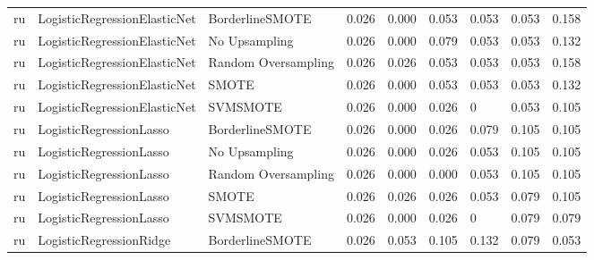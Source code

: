 \begin{tabular}{lllllllll}
      ru & LogisticRegressionElasticNet &     BorderlineSMOTE & 0.026 &                     0.000 &                 0.053 &                  0.053 &                                   0.053 &     0.158 \\
      ru & LogisticRegressionElasticNet &       No Upsampling & 0.026 &                     0.000 &                 0.079 &                  0.053 &                                   0.053 &     0.132 \\
      ru & LogisticRegressionElasticNet & Random Oversampling & 0.026 &                     0.026 &                 0.053 &                  0.053 &                                   0.053 &     0.158 \\
      ru & LogisticRegressionElasticNet &               SMOTE & 0.026 &                     0.000 &                 0.053 &                  0.053 &                                   0.053 &     0.132 \\
      ru & LogisticRegressionElasticNet &            SVMSMOTE & 0.026 &                     0.000 &                 0.026 &                      0 &                                   0.053 &     0.105 \\
      ru &      LogisticRegressionLasso &     BorderlineSMOTE & 0.026 &                     0.000 &                 0.026 &                  0.079 &                                   0.105 &     0.105 \\
      ru &      LogisticRegressionLasso &       No Upsampling & 0.026 &                     0.000 &                 0.026 &                  0.053 &                                   0.105 &     0.105 \\
      ru &      LogisticRegressionLasso & Random Oversampling & 0.026 &                     0.000 &                 0.000 &                  0.053 &                                   0.105 &     0.105 \\
      ru &      LogisticRegressionLasso &               SMOTE & 0.026 &                     0.026 &                 0.026 &                  0.053 &                                   0.079 &     0.105 \\
      ru &      LogisticRegressionLasso &            SVMSMOTE & 0.026 &                     0.000 &                 0.026 &                      0 &                                   0.079 &     0.079 \\
      ru &      LogisticRegressionRidge &     BorderlineSMOTE & 0.026 &                     0.053 &                 0.105 &                  0.132 &                                   0.079 &     0.053 \\

\end{tabular}
